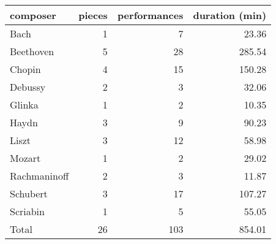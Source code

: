 \begin{tabular}{lrrr}
\toprule
composer & pieces & performances & duration (min) \\
\midrule
Bach & 1 & 7 & 23.36 \\
Beethoven & 5 & 28 & 285.54 \\
Chopin & 4 & 15 & 150.28 \\
Debussy & 2 & 3 & 32.06 \\
Glinka & 1 & 2 & 10.35 \\
Haydn & 3 & 9 & 90.23 \\
Liszt & 3 & 12 & 58.98 \\
Mozart & 1 & 2 & 29.02 \\
Rachmaninoff & 2 & 3 & 11.87 \\
Schubert & 3 & 17 & 107.27 \\
Scriabin & 1 & 5 & 55.05 \\
Total & 26 & 103 & 854.01 \\
\bottomrule
\end{tabular}
